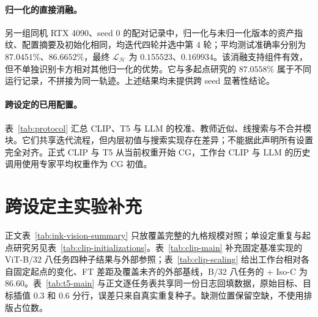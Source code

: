 \paragraph{归一化的直接消融。}
另一组同机 RTX 4090、seed 0 的配对记录中，归一化与未归一化版本的资产指纹、配置摘要及初始化相同，均迭代四轮并选中第 4 轮；平均测试准确率分别为 $87.0451\%$、$86.6652\%$，最终 $\mathcal L_{\mathcal H}$ 为 $0.155523$、$0.169934$。该消融支持组件有效，但不单独识别卡方相对其他归一化的优势。它与多起点研究的 $87.0558\%$ 属于不同运行记录，不拼接为同一轨迹。上述结果均未提供跨 seed 显著性结论。

\paragraph{跨设定的已用配置。}
表~\ref{tab:protocol} 汇总 CLIP、T5 与 LLM 的校准、教师近似、线搜索与不合并模块。它们共享迭代流程，但内层初值与搜索实现存在差异；不能据此声明所有设置完全对齐。正式 CLIP 与 T5 从当前权重开始 CG，工作台 CLIP 与 LLM 的历史调用使用专家平均权重作为 CG 初值。

\begin{table}[htbp]
\centering\small
\caption{已用配置及架构适配。这里 CLIP 列为正式实现；工作台九格属于另一实现记录，不能与其四种子合并统计。}
\label{tab:protocol}
\setlength{\tabcolsep}{3.2pt}
\renewcommand{\arraystretch}{1.12}
\resizebox{\textwidth}{!}{}
\end{table}

\newpage
\section{跨设定主实验补充}
\label{app:cross-setting}

正文表~\ref{tab:ink-vision-summary} 只放覆盖完整的九格规模对照；单设定重复与起点研究另见表~\ref{tab:clip-initializations}。表~\ref{tab:clip-main} 补充固定基准实现的 ViT-B/32 八任务四种子结果与外部参照；表~\ref{tab:clip-scaling} 给出工作台相对各自固定起点的变化、FT 差距及覆盖未齐的外部基线，B/32 八任务的 \method{} + Iso-C 为 $86.60$。表~\ref{tab:t5-main} 与正文逐任务表共享同一份日志回填数据，原始目标、目标插值 $0.3$ 和 $0.6$ 分行，误差只来自真实重复种子。缺测位置保留空缺，不使用排版占位数。





